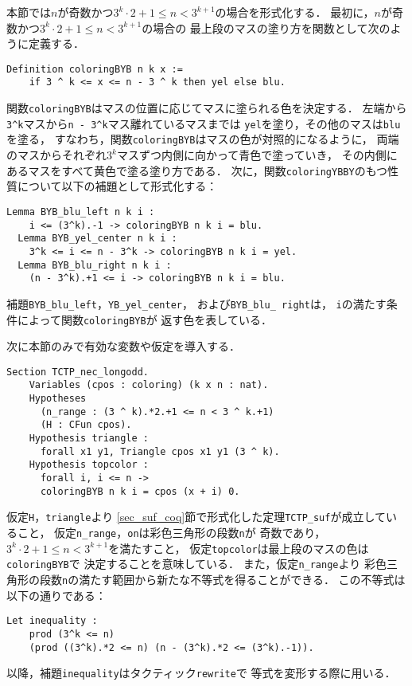 本節では$n$が奇数かつ$3^{k} \cdot 2 + 1 \leq n < 3^{k+1}$の場合を形式化する．
最初に，$n$が奇数かつ$3^{k} \cdot 2 + 1 \leq n < 3^{k+1}$の場合の
最上段のマスの塗り方を関数として次のように定義する．
\begin{lstlisting}[language=Coq]
  Definition coloringBYB n k x :=
    if 3 ^ k <= x <= n - 3 ^ k then yel else blu.
\end{lstlisting}
関数{\tt{coloringBYB}}はマスの位置に応じてマスに塗られる色を決定する．
左端から{\tt{3\verb|^|k}}マスから{\tt{n - 3\verb|^|k}}マス離れているマスまでは
{\tt{yel}}を塗り，その他のマスは{\tt{blu}}を塗る，
すなわち，関数{\tt{coloringBYB}}はマスの色が対照的になるように，
両端のマスからそれぞれ$3^k$マスずつ内側に向かって青色で塗っていき，
その内側にあるマスをすべて黄色で塗る塗り方である．
次に，関数{\tt{coloringYBBY}}のもつ性質について以下の補題として形式化する：
\begin{lstlisting}[language=Coq]
  Lemma BYB_blu_left n k i :
    i <= (3^k).-1 -> coloringBYB n k i = blu.
  Lemma BYB_yel_center n k i :
    3^k <= i <= n - 3^k -> coloringBYB n k i = yel.
  Lemma BYB_blu_right n k i :
    (n - 3^k).+1 <= i -> coloringBYB n k i = blu.
\end{lstlisting}
補題{\tt{BYB\_blu\_left}}，{\tt{YB\_yel\_center}}，
および{\tt{BYB\_blu\_ right}}は，
{\tt{i}}の満たす条件によって関数{\tt{coloringBYB}}が
返す色を表している．

次に本節のみで有効な変数や仮定を導入する．
\begin{lstlisting}[language=Coq]
  Section TCTP_nec_longodd.
    Variables (cpos : coloring) (k x n : nat).
    Hypotheses
      (n_range : (3 ^ k).*2.+1 <= n < 3 ^ k.+1)
      (H : CFun cpos).
    Hypothesis triangle :
      forall x1 y1, Triangle cpos x1 y1 (3 ^ k).
    Hypothesis topcolor :
      forall i, i <= n ->
      coloringBYB n k i = cpos (x + i) 0.
\end{lstlisting}
仮定{\tt{H}}，{\tt{triangle}}より
\ref{sec_suf_coq}節で形式化した定理{\tt{TCTP\_suf}}が成立していること，
仮定{\tt{n\_range}}，{\tt{on}}は彩色三角形の段数{\tt{n}}が
奇数であり，$3^{k} \cdot 2 + 1 \leq n < 3^{k+1}$を満たすこと，
仮定{\tt{topcolor}}は最上段のマスの色は{\tt{coloringBYB}}で
決定することを意味している．
また，仮定{\tt{n\_range}}より
彩色三角形の段数{\tt{n}}の満たす範囲から新たな不等式を得ることができる．
この不等式は以下の通りである：
\begin{lstlisting}[language=Coq]
  Let inequality :
    prod (3^k <= n)
    (prod ((3^k).*2 <= n) (n - (3^k).*2 <= (3^k).-1)).
\end{lstlisting}
以降，補題{\tt{inequality}}はタクティック{\tt{rewrite}}で
等式を変形する際に用いる．

